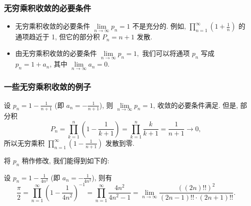
\begin{frame}
\frametitle{无穷乘积收敛的必要条件}

\begin{remark}
\begin{itemize}
\item 无穷乘积收敛的必要条件 $\lim\limits_{n \to \infty} p_n = 1$ 不是充分的. 例如, $\prod_{n=1}^\infty \left(1 + \frac{1}{n}\right)$ 的通项趋近于 1, 但它的部分积 $P_n = n + 1$ 发散.
\item 由无穷乘积收敛的必要条件 $\lim\limits_{n \to \infty} p_n = 1,$ 我们可以将通项 $p_n$ 写成 $p_n = 1 + a_n$, 其中 $\lim\limits_{n \to \infty} a_n = 0$.
\end{itemize}
\end{remark}

\end{frame}


\begin{frame}
\frametitle{一些无穷乘积收敛的例子}

\begin{eg}[发散到零的无穷乘积]
设 $p_n = 1 - \frac{1}{n+1}$ (即 $a_n = -\frac{1}{n+1}$), 则 $\lim\limits_{n \to \infty} p_n = 1$, 收敛的必要条件满足.
\pause
但是, 部分积
\[
P_n = \prod_{k=1}^n \left(1 - \frac{1}{k+1}\right) = \prod_{k=1}^n \frac{k}{k+1} = \frac{1}{n+1} \to 0,
\]
所以无穷乘积 $\prod_{n=1}^\infty \left(1 - \frac{1}{n+1}\right)$ 发散到零.
\end{eg}

\pause

将 $p_n$ 稍作修改, 我们能得到如下的:

\begin{eg}[Wallis 公式]
设 $p_n = 1 - \frac{1}{4n^2}$ (即 $a_n = -\frac{1}{4n^2}$), 则有
\[
\frac{\pi}{2} = \prod_{n=1}^\infty \left(1 - \frac{1}{4n^2}\right)^{-1} = \prod_{n=1}^\infty \dfrac{4n^2}{4n^2 - 1} = \lim_{n \to \infty} \dfrac{((2n)!!)^2}{(2n-1)!! \cdot (2n+1)!!}.
\]
\end{eg}

\end{frame}


